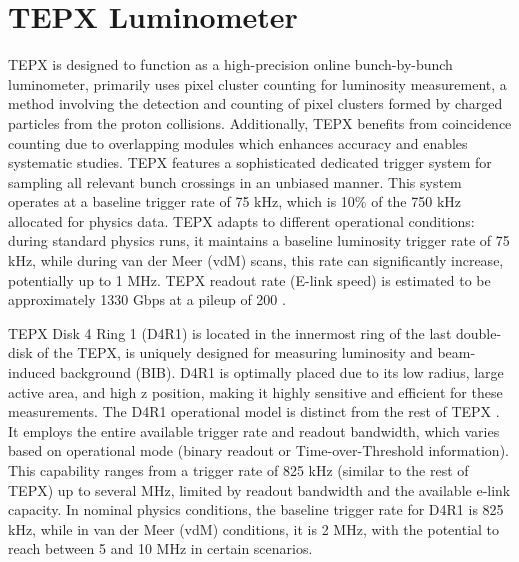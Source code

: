 \newpage
\section{TEPX Luminometer}

TEPX is designed to function as a high-precision online bunch-by-bunch luminometer, primarily uses pixel cluster counting for luminosity measurement, a method involving the detection and counting of pixel clusters formed by charged particles from the proton collisions. Additionally, TEPX benefits from coincidence counting due to overlapping modules which enhances accuracy and enables systematic studies. %
TEPX features a sophisticated dedicated trigger system for sampling all relevant bunch crossings in an unbiased manner. This system operates at a baseline trigger rate of 75 kHz, which is 10$\%$  of the 750 kHz allocated for physics data. %
TEPX adapts to different operational conditions: during standard physics runs, it maintains a baseline luminosity trigger rate of 75 kHz, while during van der Meer (vdM) scans, this rate can significantly increase, potentially up to 1 MHz. TEPX readout rate (E-link speed) is estimated to be approximately 1330 Gbps at a pileup of 200  \cite{Collaboration:2706512}.

TEPX Disk 4 Ring 1 (D4R1) is located in the innermost ring of the last double-disk of the TEPX, is uniquely designed for measuring luminosity and beam-induced background (BIB). D4R1 is optimally placed due to its low radius, large active area, and high z position, making it highly sensitive and efficient for these measurements. The D4R1 operational model is distinct from the rest of TEPX \cite{Haranko2023}. It employs the entire available trigger rate and readout bandwidth, which varies based on operational mode (binary readout or Time-over-Threshold information). This capability ranges from a trigger rate of 825 kHz (similar to the rest of TEPX) up to several MHz, limited by readout bandwidth and the available e-link capacity. In nominal physics conditions, the baseline trigger rate for D4R1 is 825 kHz, while in van der Meer (vdM) conditions, it is 2 MHz, with the potential to reach between 5 and 10 MHz in certain scenarios. 

